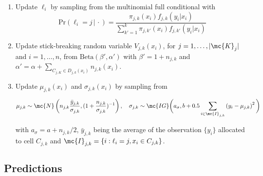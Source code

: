 \begin{enumerate}
\item Update $\ell_i$ by sampling from the multinomial full conditional with 
\[\mbox{Pr}( \ell_i = j\, |\, \cdot) = \frac{ \pi_{j,k}(x_i)f_{j,k}(y_i|x_i) }{ \sum_{k'=1}^k \pi_{j,k'}(x_i)f_{j,k'}(y_i | x_i) } \label{eq:prS}\]

\item Update stick-breaking random variable $V_{j,k}(x_i)$, for $j=1, \ldots, |\mc{K}_j|$ and $i=1, \ldots, n$, from $\mbox{Beta}(\beta',\alpha')$ with $\beta'=1+n_{j,k}$ and $\alpha'=\alpha+\sum_{C_{j,K} \in D_{j,k}(x_i)} n_{j,k}(x_i)$.

\item Update $\mu_{j,k}(x_i)$ and $\sigma_{j,k}(x_i)$ by sampling from

\begin{align*}
	\mu_{j,k} \sim \mc{N}\left(n_{j,k}\frac{\bar{y}_{j,k}}{ \sigma_{j,k}} , (1+\frac{n_{j,k}}{\sigma_{j,k}})^{-1}\right), \quad
	 \sigma_{j,k} \sim \mc{IG}\bigg(a_{\sigma},b+0.5\sum_{i \in \mc{I}_{j,k}} \left(y_{i}-\mu_{j,k}\right)^2\bigg)	
\end{align*}

with $a_{\sigma}=a+n_{j,k}/2$, $\bar{y}_{j,k}$ being the average of the observation $\{y_i\}$ allocated to cell $C_{j,k}$ and $\mc{I}_{j,k}=\{i : \ell_i=j, x_i \in C_{j,k}\}$.

\end{enumerate}



\subsection{Predictions}\label{ch3:predictions}


